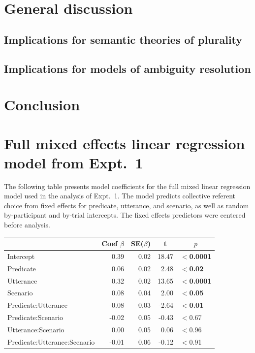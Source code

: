 \documentclass[linguex]{sp}
\begin{document}
\section{General discussion}


\subsection{Implications for semantic theories of plurality}


\subsection{Implications for models of ambiguity resolution}


\section{Conclusion}


\appendix
\section{Full mixed effects linear regression model from Expt.~1}\label{expt1results}


The following table presents model coefficients for the full mixed linear regression model used in the analysis of Expt.~1. The model predicts collective referent choice from fixed effects for predicate, utterance, and scenario, as well as random by-participant and by-trial intercepts. The fixed effects predictors were centered before analysis.

\begin{center}

\begin{tabular}{lrrrl}\toprule
	&	Coef $\beta$	&	SE($\beta$)	&	\multicolumn{1}{c}{ \textbf{t}}	&	\multicolumn{1}{c}{$p$}\\ \midrule
Intercept	&	0.39	&	0.02	&	18.47	&	\textbf{$<$0.0001}\\
Predicate	&	0.06	&	0.02	&	2.48	&	\textbf{$<$0.02}\\
Utterance	&	0.32	&	0.02	&	13.65	&	\textbf{$<$0.0001}\\
Scenario	&	0.08	&	0.04	&	2.00	&	\textbf{$<$0.05}\\
Predicate:Utterance	&	-0.08	&	0.03	&	-2.64	&	\textbf{$<$0.01}\\
Predicate:Scenario	&	-0.02	&	0.05	&	-0.43	&	$<$0.67\\
Utterance:Scenario	&	0.00	&	0.05	&	0.06	&	$<$0.96\\
Predicate:Utterance:Scenario	&	-0.01	&	0.06	&	-0.12	&	$<$0.91\\
\bottomrule
\end{tabular}

\end{center}
 
\end{document}
